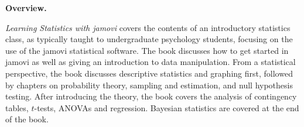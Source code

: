 

\clearpage
\newpage

\begin{center}
{\bf Overview.}
\end{center}

{\it Learning Statistics with jamovi} covers the contents of an introductory statistics class, as typically taught to undergraduate psychology students, focusing on the use of the jamovi statistical software. The book discusses how to get started in jamovi as well as giving an introduction to data manipulation. From a statistical perspective, the book discusses descriptive statistics and graphing first, followed by chapters on probability theory, sampling and estimation, and null hypothesis testing. After introducing the theory, the book covers the analysis of contingency tables, $t$-tests, ANOVAs and regression. Bayesian statistics are covered at the end of the book. 

